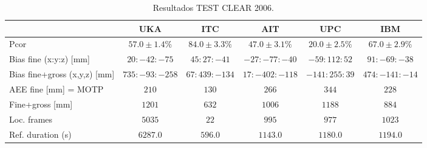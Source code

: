 \clearpage
\begin{table}
  \begin{center}

    \begin{tabular}{||l|c|c|c|c|c||}
      \hline \hline
      & UKA & ITC & AIT & UPC & IBM\\
      \hline
      \hline
      Pcor & $57.0\pm1.4\%$ & $84.0\pm3.3\%$ & $47.0\pm3.1\%$ & $20.0\pm2.5\%$ & $67.0\pm2.9\%$ \\
      \hline
      Bias fine (x:y:z) [mm] & $20:-42:-75$ & $45:27:-41$ & $-27:-77:-40$ & $-59:112:52$ & $91:-69:-38$ \\
      \hline
      Bias fine+gross (x,y,z) [mm] & $735:-93:-258$ & $67:439:-134$ & $17:-402:-118$ & $-141:255:39$ & $474:-141:-14$ \\
      \hline
      AEE fine [mm] = MOTP & $210$ & $130$ & $266$ & $344$ & $228$ \\
      \hline
      Fine+gross [mm] & $1201$ & $632$ & $1006$ & $1188$ & $884$ \\
      \hline
      Loc. frames & $5035$ & $22$ & $995$ & $977$ & $1023$ \\
      \hline
      Ref. duration (s) & $6287.0$ & $596.0$ & $1143.0$ & $1180.0$ & $1194.0$ \\
      \hline \hline
    \end{tabular}
    \caption{Resultados TEST CLEAR 2006.}
    \label{tab:tablas2006}
  \end{center}
\end{table}





